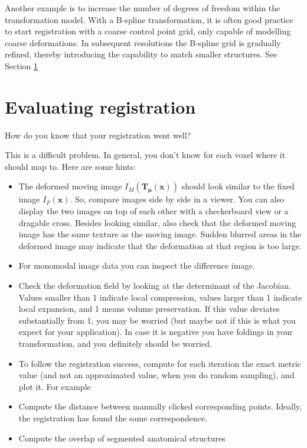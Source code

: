 \documentclass[]{report}
\newcommand{\vx}{\bm{x}}
\newcommand{\vmu}{\bm{\mu}}
\newcommand{\vT}{\bm{T}}
\begin{document}
Another example is to increase the number of degrees of freedom
within the transformation model. With a B-spline transformation, it
is often good practice to start registration with a coarse control
point grid, only capable of modelling coarse deformations. In
subsequent resolutions the B-spline grid is gradually refined,
thereby introducing the capability to match smaller structures. See
Section \ref{}

\section{Evaluating registration}

How do you know that your registration went well?

This is a difficult problem. In general, you don't know for each
voxel where it should map to. Here are some hints:

\begin{itemize}
\item The deformed moving image $I_M(\vT_{\vmu}(\vx))$ should
look similar to the fixed image $I_F(\vx)$. So, compare images side
by side in a viewer. You can also display the two images on top of
each other with a checkerboard view or a dragable cross. Besides
looking similar, also check that the deformed moving image has the
same texture as the moving image. Sudden blurred areas in the
deformed image may indicate that the deformation at that region is
too large.

\item For monomodal image data you can inspect the difference image.

\item Check the deformation field by looking at the determinant of
the Jacobian. Values smaller than 1 indicate local compression,
values larger than 1 indicate local expansion, and 1 means volume
preservation. If this value deviates substantially from 1, you may be
worried (but maybe not if this is what you expect for your
application). In case it is negative you have foldings in your
transformation, and you definitely should be worried.

\item To follow the registration success, compute for each iteration
the exact metric value (and not an approximated value, when you do
random sampling), and plot it. For example

\item Compute the distance between manually clicked corresponding
points. Ideally, the registration has found the same correspondence.

\item Compute the overlap of segmented anatomical structures


\end{itemize}
\end{document}

